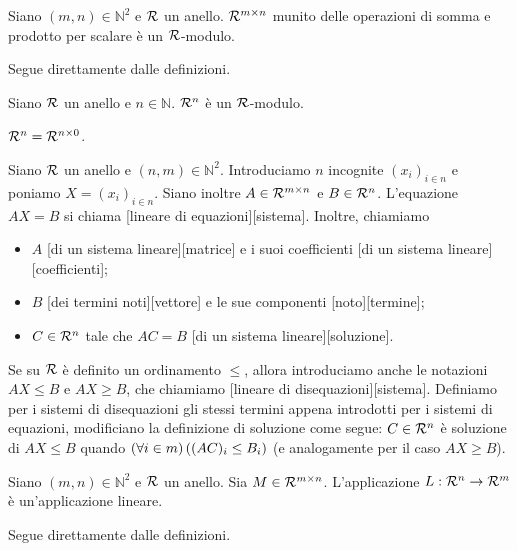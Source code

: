 \begin{Theorem}
	Siano $(m,n) \in \mathbb{N}^2$ e $\mathcal{R}$ un anello. $\mathcal{R}^{m \times n}$ munito delle operazioni di somma e prodotto per scalare \`e un $\mathcal{R}$-modulo.
\end{Theorem}
\Proof Segue direttamente dalle definizioni. \EndProof
\begin{Corollary}
	Siano $\mathcal{R}$ un anello e $n \in \mathbb{N}$. $\mathcal{R}^n$ \`e un $\mathcal{R}$-modulo.
\end{Corollary}
\Proof $\mathcal{R}^n = \mathcal{R}^{n \times 0}$. \EndProof
\begin{Definition}
	Siano $\mathcal{R}$ un anello e $(n,m) \in \mathbb{N}^2$. Introduciamo $n$ incognite $(x_i)_{i \in n}$ e poniamo $X = (x_i)_{i \in n}$. Siano inoltre $A \in \mathcal{R}^{m \times n}$ e $B \in \mathcal{R}^n$. L'equazione $AX = B$ si chiama [lineare di equazioni][sistema]. Inoltre, chiamiamo
	\begin{itemize}
		\item $A$ [di un sistema lineare][matrice] e i suoi coefficienti [di un sistema lineare][coefficienti];
		\item $B$ [dei termini noti][vettore] e le sue componenti [termine];
		\item $C \in \mathcal{R}^n$ tale che $AC = B$ [di un sistema lineare][soluzione].
	\end{itemize}
	Se su $\mathcal{R}$ \`e definito un ordinamento $\leq$, allora introduciamo anche le notazioni $AX \leq B$ e $AX \geq B$, che chiamiamo [lineare di disequazioni][sistema]. Definiamo per i sistemi di disequazioni gli stessi termini appena introdotti per i sistemi di equazioni, modificiano la definizione di soluzione come segue: $C \in \mathcal{R}^n$ \`e soluzione di $AX \leq B$ quando $\left ( \forall i \in m \right ) \left ( (AC)_i \leq B_i \right )$ (e analogamente per il caso $AX \geq B$).
\end{Definition}
\begin{Theorem}
	Siano $(m,n) \in \mathbb{N}^2$ e $\mathcal{R}$ un anello. Sia $M \in \mathcal{R}^{m \times n}$. L'applicazione $L: \mathcal{R}^n \rightarrow \mathcal{R}^m$ \`e un'applicazione lineare.
\end{Theorem}
\Proof Segue direttamente dalle definizioni. \EndProof
